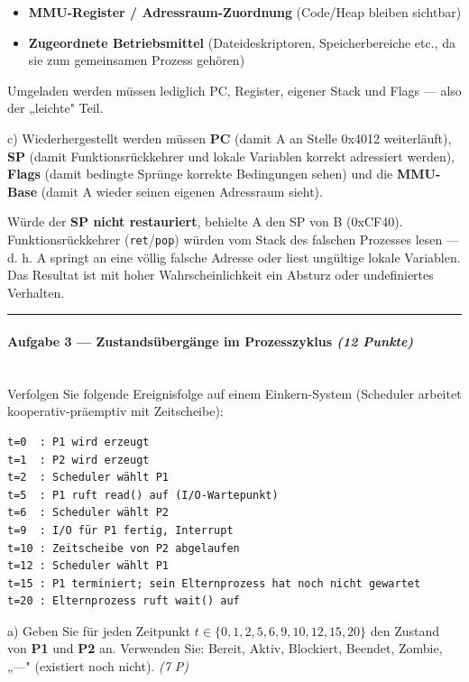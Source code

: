 \documentclass[11pt, a4paper]{article}
\begin{document}
\begin{itemize}
  \item \textbf{MMU-Register / Adressraum-Zuordnung} (Code/Heap bleiben sichtbar)
  \item \textbf{Zugeordnete Betriebsmittel} (Dateideskriptoren, Speicherbereiche etc., da sie zum gemeinsamen Prozess gehören)
\end{itemize}

Umgeladen werden müssen lediglich PC, Register, eigener Stack und Flags — also der „leichte" Teil.


c) Wiederhergestellt werden müssen \textbf{PC} (damit A an Stelle 0x4012 weiterläuft), \textbf{SP} (damit Funktionsrückkehrer und lokale Variablen korrekt adressiert werden), \textbf{Flags} (damit bedingte Sprünge korrekte Bedingungen sehen) und die \textbf{MMU-Base} (damit A wieder seinen eigenen Adressraum sieht).


Würde der \textbf{SP nicht restauriert}, behielte A den SP von B (0xCF40). Funktionsrückkehrer (\texttt{ret}/\texttt{pop}) würden vom Stack des falschen Prozesses lesen — d. h. A springt an eine völlig falsche Adresse oder liest ungültige lokale Variablen. Das Resultat ist mit hoher Wahrscheinlichkeit ein Absturz oder undefiniertes Verhalten.



\noindent\textcolor{rulegray}{\rule{\linewidth}{0.4pt}}


\paragraph{Aufgabe 3 — Zustandsübergänge im Prozesszyklus \textit{(12 Punkte)}}\mbox{}\\[2pt]

Verfolgen Sie folgende Ereignisfolge auf einem Einkern-System (Scheduler arbeitet kooperativ-präemptiv mit Zeitscheibe):


\begin{lstlisting}
t=0  : P1 wird erzeugt
t=1  : P2 wird erzeugt
t=2  : Scheduler wählt P1
t=5  : P1 ruft read() auf (I/O-Wartepunkt)
t=6  : Scheduler wählt P2
t=9  : I/O für P1 fertig, Interrupt
t=10 : Zeitscheibe von P2 abgelaufen
t=12 : Scheduler wählt P1
t=15 : P1 terminiert; sein Elternprozess hat noch nicht gewartet
t=20 : Elternprozess ruft wait() auf
\end{lstlisting}


a) Geben Sie für jeden Zeitpunkt $t \in \{0,1,2,5,6,9,10,12,15,20\}$ den Zustand von \textbf{P1} und \textbf{P2} an. Verwenden Sie: Bereit, Aktiv, Blockiert, Beendet, Zombie, „—" (existiert noch nicht). \textit{(7 P)}
\end{document}
